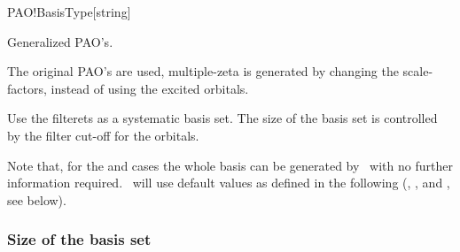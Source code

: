 \begin{fdfentry}{PAO!BasisType}[string]
\begin{fdfoptions}
    \option[nodes]%
    
    Generalized PAO's.


    \option[nonodes]%

    The original PAO's are used, multiple-zeta is generated by
    changing the scale-factors, instead of using the excited orbitals.

    
    \option[filteret]
    
    Use the filterets as a systematic basis set.  The size of the
    basis set is controlled by the filter cut-off for the orbitals.
    
  \end{fdfoptions}
  
  \noindent
  Note that, for the  and  cases the whole
  basis can be generated by \siesta\ with no further information
  required. \siesta\ will use default values as defined in the
  following (, , and
  , see below).
  
\end{fdfentry}


\subsubsection{Size of the basis set}

